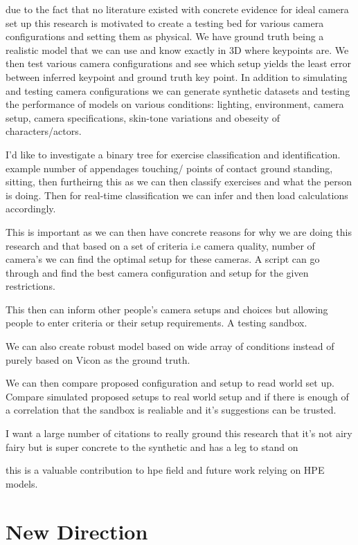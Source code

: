 due to the fact that no literature existed with concrete evidence for ideal camera set up this research is motivated to create a testing bed for various camera configurations and setting them as physical. We have ground truth being a realistic model that we can use and know exactly in 3D where keypoints are. We then test various camera configurations and see which setup yields the least error between inferred keypoint and ground truth key point. In addition to simulating and testing camera configurations we can generate synthetic datasets and testing the performance of models on various conditions: lighting, environment, camera setup, camera specifications, skin-tone variations and obeseity of characters/actors.

I'd like to investigate a binary tree for exercise classification and identification.
example number of appendages touching/ points of contact ground standing, sitting, then furtheirng this as we can then classify exercises and what the person is doing. Then for real-time classification we can infer and then load calculations accordingly.

This is important as we can then have concrete reasons for why we are doing this research and that based on a set of criteria i.e camera quality, number of camera's we can find the optimal setup for these cameras. A script can go through and find the best camera configuration and setup for the given restrictions. 

This then can inform other people's camera setups and choices but allowing people to enter criteria or their setup requirements. A testing sandbox.

We can also create robust model based on wide array of conditions instead of purely based on Vicon as the ground truth. 

We can then compare proposed configuration and setup to read world set up. Compare simulated proposed setups to real world setup and if there is enough of a correlation that the sandbox is realiable and it's suggestions can be trusted.

I want a large number of citations to really ground this research that it's not airy fairy but is super concrete to the synthetic and has a leg to stand on

this is a valuable contribution to hpe field and future work relying on HPE models.

\section{New Direction}

